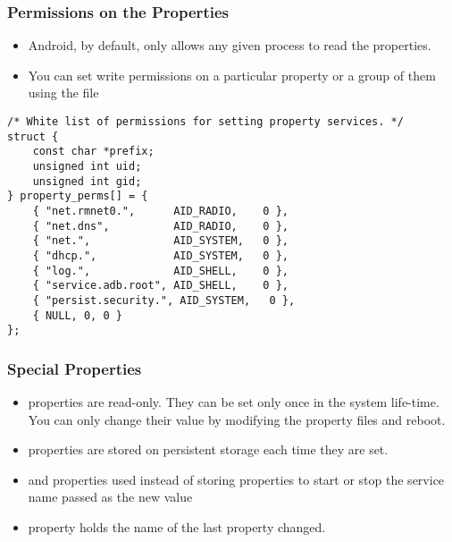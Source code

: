 \begin{frame}[fragile]
  \frametitle{Permissions on the Properties}
  \begin{itemize}
  \item Android, by default, only allows any given process to read the
    properties.
  \item You can set write permissions on a particular property or a
    group of them using the file
  \end{itemize}
\begin{verbatim}
/* White list of permissions for setting property services. */
struct {
    const char *prefix;
    unsigned int uid;
    unsigned int gid;
} property_perms[] = {
    { "net.rmnet0.",      AID_RADIO,    0 },
    { "net.dns",          AID_RADIO,    0 },
    { "net.",             AID_SYSTEM,   0 },
    { "dhcp.",            AID_SYSTEM,   0 },
    { "log.",             AID_SHELL,    0 },
    { "service.adb.root", AID_SHELL,    0 },
    { "persist.security.", AID_SYSTEM,   0 },
    { NULL, 0, 0 }
};
\end{verbatim}
\end{frame}

\begin{frame}
  \frametitle{Special Properties}
  \begin{itemize}
  \item {} properties are read-only. They can be set only
    once in the system life-time. You can only change their value by
    modifying the property files and reboot.
  \item {} properties are stored on persistent storage
    each time they are set.
  \item {} and  properties used instead
    of storing properties to start or stop the service name passed as
    the new value
  \item {} property holds the name of the last
     property changed.
  \end{itemize}
\end{frame}
